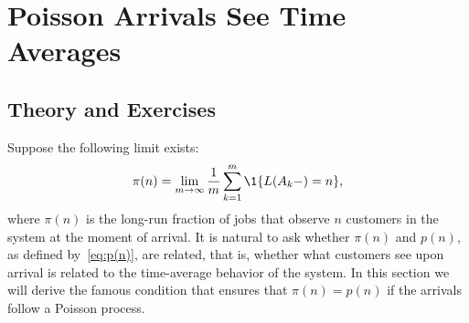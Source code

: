 \section{Poisson Arrivals See Time Averages}
\label{sec:poisson-arrivals-see}

\subsection*{Theory and Exercises}


Suppose the following limit exists:
\begin{equation}\label{eq:jaap}
  \pi(n) 
= \lim_{m\to\infty} 
\frac1m\sum_{k=1}^m \1{L(A_k-) = n},
\end{equation}
where $\pi(n)$ is the long-run fraction of jobs that observe $n$
customers in the system at the moment of arrival.  It is natural to
ask whether $\pi(n)$ and $p(n)$, as defined by~\eqref{eq:p(n)}, are related, that is, whether what
customers see upon arrival is related to the time-average behavior of
the system. In this section we will derive the famous  condition  that ensures that  $\pi(n)=p(n)$ if the arrivals follow a Poisson process. 


\begin{comment}
\begin{hint}
Check the definitions of $Y(0,t)$, $Y(1,t)$, $A(0,t)$ and so on. Make a drawing of $Y(0, t)$ and $Y(1,t)$ as functions of $t$. 
\end{hint}
  \begin{solution}
 $A(t)=\lfloor t\rfloor$ provided the unit of $t$ is in
  hours. $A(0,t)=A(t)$ and $A(n,t)=0$ for $n>0$.  Next, for $Y(0,t)$ we define, for notational ease, the fractional part of $t$ as $\{t\} = t - \lfloor t \rfloor$. Then,
  \begin{align*}
    Y(0,t)&= \frac 1{60} \lfloor t \rfloor + \{t\} \1{ \{t\} \in[59/60, 1)} \approx \frac{1}{60}t, \\
    Y(1,t)&= \frac{59}{60} \lfloor t \rfloor + \{t\} \1{\{t\}\in[0,59/60)} \approx \frac{59}{60}t. \\
\lambda(0) &= \lim_t \frac{A(0,t)}{Y(0,t)} = \lim_t \frac{t}{t/60} = 60, \\
\lambda(1) &= \lim_t \frac{A(1,t)}{Y(1,t)} = \lim_t\frac{0}{59/60 t} = 0 \\
\lambda(n) &= 0, \quad n\geq 1. \\
\lambda &= \lim_t \frac{A(t)}t  = 1 \\
p(0)  &= \frac{1}{60}, \\
p(1)  &= \frac{59}{60}, \\
\rho  &= \frac{59}{60}, \\
\pi(0)  &= 1. \\
  \end{align*}
  There is no queue so $\E{L_Q} = 0$, but $\E L = \rho$.  The queue
  length as observed by customers is equal to 0, because jobs only
  arrive when the server is free.
  \end{solution}
\end{exercise}
  \end{comment}

